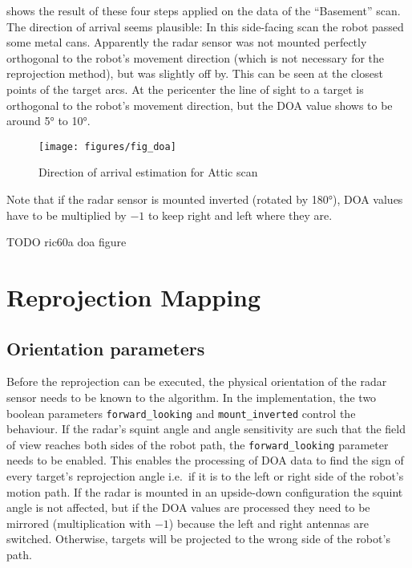  shows the result of these four steps applied on the data of
the ``Basement'' scan. The direction of arrival seems plausible: In this
side-facing scan the robot passed some metal cans. Apparently the radar
sensor was not mounted perfectly orthogonal to the robot's movement
direction (which is not necessary for the reprojection method), but was
slightly off by. This can be seen at the closest points of the target
arcs. At the pericenter the line of sight to a target is orthogonal to
the robot's movement direction, but the DOA value shows to be around \ang{5}
to \ang{10}.

\begin{figure}[htbp]
    \centering
    \texttt{[image: figures/fig\_doa]}
    \caption{Direction of arrival estimation for Attic scan}
    \label{fig:fig_doa}
\end{figure}

Note that if the radar sensor is mounted inverted (rotated by \ang{180}), DOA
values have to be multiplied by \(-1\) to keep right and left where they
are.

TODO ric60a doa figure

\section{Reprojection Mapping}\label{reprojection-mapping}

\subsection{Orientation parameters}\label{orientation-parameters}

Before the reprojection can be executed, the physical orientation of the
radar sensor needs to be known to the algorithm. In the implementation,
the two boolean parameters \texttt{forward\_looking} and
\texttt{mount\_inverted} control the behaviour. If the radar's squint
angle and angle sensitivity are such that the field of view reaches both
sides of the robot path, the \texttt{forward\_looking} parameter needs
to be enabled. This enables the processing of DOA data to find the sign
of every target's reprojection angle i.e.~if it is to the left or right
side of the robot's motion path. If the radar is mounted in an
upside-down configuration the squint angle is not affected, but if the
DOA values are processed they need to be mirrored (multiplication with
\(-1\)) because the left and right antennas are switched. Otherwise,
targets will be projected to the wrong side of the robot's path.

